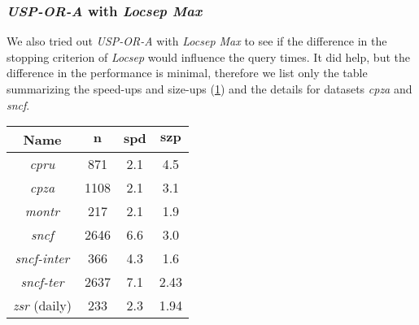 	\subsubsection{\textit{USP-OR-A} with \textit{Locsep Max}}
	
		\noindent We also tried out \textit{USP-OR-A} with \textit{Locsep Max} to see if the difference in the stopping criterion of \textit{Locsep} would influence the query times. It did help, but the difference in the performance is minimal, therefore we list only the table summarizing the speed-ups and size-ups (\ref{tab:usporam-speedup}) and the details for datasets \textit{cpza} and \textit{sncf}.
	
		\begin{table}[H]
			\centering
			\begin{tabular}{c|c|c|c}
	            \rowcolor{tablehead}
	            \textbf{Name} & $\bm{n}$ & $\bm{spd}$ & $\bm{szp}$ \\
				\hline
				\textit{cpru} & 871 & 2.1 & 4.5 \\
				\textit{cpza} & 1108 & 2.1 & 3.1 \\
				\textit{montr} & 217 & 2.1 & 1.9 \\
				\textit{sncf} & 2646 & 6.6 & 3.0 \\
				\textit{sncf-inter} & 366 & 4.3 & 1.6 \\
				\textit{sncf-ter} & 2637 & 7.1 & 2.43 \\
				\textit{zsr} (daily) & 233 & 2.3 & 1.94 \\	
			\end{tabular}
			\label{tab:usporam-speedup}
		\end{table}
		
		\begin{figure}[H]
		\centering
		\end{figure}
	
